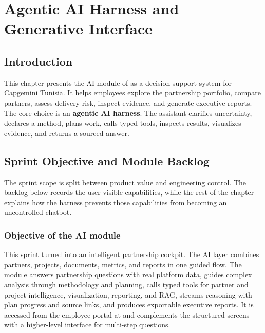 \chapter{Agentic AI Harness and Generative Interface}
\section*{Introduction}
This chapter presents the AI module of \projectname{} as a decision-support system for Capgemini Tunisia. It helps employees explore the partnership portfolio, compare partners, assess delivery risk, inspect evidence, and generate executive reports.
The core choice is an \textbf{agentic AI harness}. The assistant clarifies uncertainty, declares a method, plans work, calls typed tools, inspects results, visualizes evidence, and returns a sourced answer.
\section{Sprint Objective and Module Backlog}
The sprint scope is split between product value and engineering control. The backlog below records the user-visible capabilities, while the rest of the chapter explains how the harness prevents those capabilities from becoming an uncontrolled chatbot.
\subsection{Objective of the AI module}
This sprint turned \projectname{} into an intelligent partnership cockpit. The AI layer combines partners, projects, documents, metrics, and reports in one guided flow.
The module answers partnership questions with real platform data, guides complex analysis through methodology and planning, calls typed tools for partner and project intelligence, visualization, reporting, and RAG, streams reasoning with plan progress and source links, and produces exportable executive reports.
It is accessed from the employee portal at  and complements the structured screens with a higher-level interface for multi-step questions.

